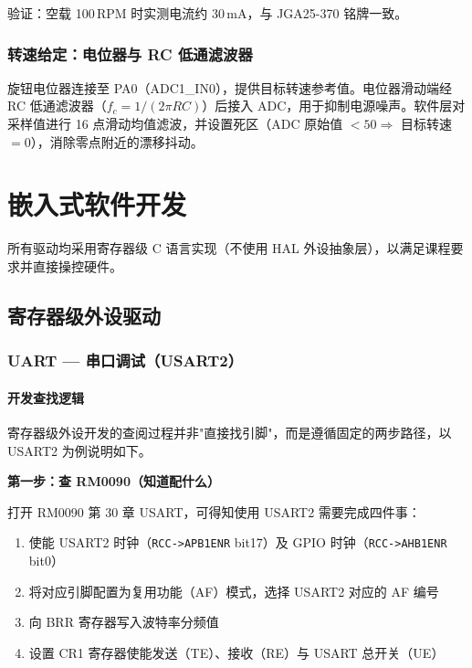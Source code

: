\documentclass[12pt, a4paper]{ctexrep}
\begin{document}
验证：空载 100\,RPM 时实测电流约 30\,mA，与 JGA25-370 铭牌一致。

\subsection{转速给定：电位器与 RC 低通滤波器}

旋钮电位器连接至 PA0（ADC1\_IN0），提供目标转速参考值。电位器滑动端经 RC 低通滤波器（$f_c = 1/(2\pi RC)$）后接入 ADC，用于抑制电源噪声。软件层对采样值进行 16 点滑动均值滤波，并设置死区（ADC 原始值 $< 50 \Rightarrow$ 目标转速 $= 0$），消除零点附近的漂移抖动。

\chapter{嵌入式软件开发}

所有驱动均采用寄存器级 C 语言实现（不使用 HAL 外设抽象层），以满足课程要求并直接操控硬件。

\section{寄存器级外设驱动}

\subsection{UART — 串口调试（USART2）}

\subsubsection*{开发查找逻辑}

寄存器级外设开发的查阅过程并非"直接找引脚"，而是遵循固定的两步路径，以 USART2 为例说明如下。

\textbf{第一步：查 RM0090（知道配什么）}

打开 RM0090 第 30 章 USART，可得知使用 USART2 需要完成四件事：
\begin{enumerate}
    \item 使能 USART2 时钟（\texttt{RCC->APB1ENR} bit17）及 GPIO 时钟（\texttt{RCC->AHB1ENR} bit0）
    \item 将对应引脚配置为复用功能（AF）模式，选择 USART2 对应的 AF 编号
    \item 向 BRR 寄存器写入波特率分频值
    \item 设置 CR1 寄存器使能发送（TE）、接收（RE）与 USART 总开关（UE）
\end{enumerate}
\end{document}
